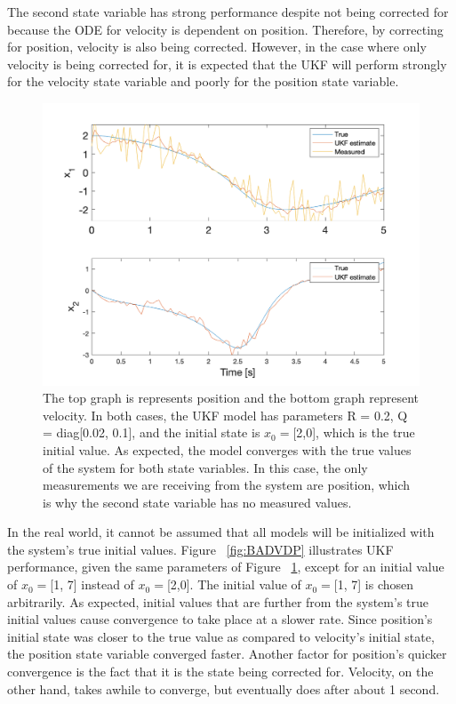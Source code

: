 \noindent The second state variable has strong performance despite not being corrected for because the ODE for velocity is dependent on position. Therefore, by correcting for position, velocity is also being corrected. However, in the case where only velocity is being corrected for, it is expected that the UKF will perform strongly for the velocity state variable and poorly for the position state variable.



\begin{figure}[ht]
    \centering
    \includegraphics[scale = 0.6]{VDP.png}
    \caption{The top graph is represents position and the bottom graph represent velocity. In both cases, the UKF model has parameters R = 0.2, Q = diag[0.02, 0.1], and the initial state is $x_0=$[2,0], which is the true initial value.
    As expected, the model converges with the true values of the system for both state variables. In this case, the only measurements we are receiving from the system are position, which is why the second state variable has no measured values.}
\label{fig:VDP}
\end{figure}

\clearpage

\noindent In the real world, it cannot be assumed that all models will be initialized with the system's true initial values. Figure ~\ref{fig:BADVDP} illustrates UKF performance, given the same parameters of Figure ~\ref{fig:VDP}, except for an initial value of $x_0=$[1, 7]  instead of $x_0=$[2,0]. The initial value of $x_0=$[1, 7]  is chosen arbitrarily. As expected, initial values that are further from the system's true initial values cause convergence to take place at a slower rate. Since position's initial state was closer to the true value as compared to velocity's initial state, the position state variable converged faster. Another factor for position's quicker convergence is the fact that it is the state being corrected for. Velocity, on the other hand, takes awhile to converge, but eventually does after about 1 second. 



